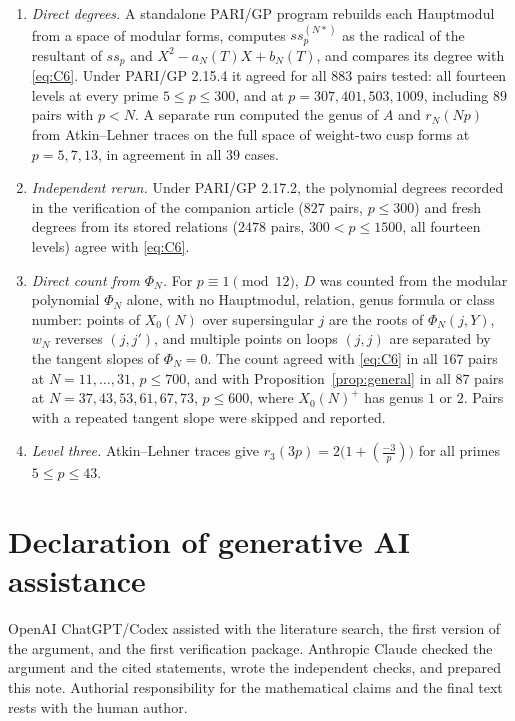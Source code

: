\documentclass[11pt,a4paper]{article}
\theoremstyle{remark}\newtheorem{remark}[theorem]{Remark}
\numberwithin{equation}{section}
\newcommand{\leg}[2]{\left(\frac{#1}{#2}\right)}
\begin{document}
\begin{enumerate}
\item \emph{Direct degrees.} A standalone PARI/GP program rebuilds each Hauptmodul from a space of modular forms, computes $ss_p^{(N*)}$ as the radical of the resultant of $ss_p$ and $X^2-a_N(T)X+b_N(T)$, and compares its degree with \eqref{eq:C6}. Under PARI/GP 2.15.4 it agreed for all $883$ pairs tested: all fourteen levels at every prime $5\leq p\leq300$, and at $p=307,401,503,1009$, including $89$ pairs with $p<N$. A separate run computed the genus of $A$ and $r_N(Np)$ from Atkin--Lehner traces on the full space of weight-two cusp forms at $p=5,7,13$, in agreement in all $39$ cases.
\item \emph{Independent rerun.} Under PARI/GP 2.17.2, the polynomial degrees recorded in the verification of the companion article ($827$ pairs, $p\leq300$) and fresh degrees from its stored relations ($2478$ pairs, $300<p\leq1500$, all fourteen levels) agree with \eqref{eq:C6}.
\item \emph{Direct count from $\Phi_N$.} For $p\equiv1\pmod{12}$, $D$ was counted from the modular polynomial $\Phi_N$ alone, with no Hauptmodul, relation, genus formula or class number: points of $X_0(N)$ over supersingular $j$ are the roots of $\Phi_N(j,Y)$, $w_N$ reverses $(j,j')$, and multiple points on loops $(j,j)$ are separated by the tangent slopes of $\Phi_N=0$. The count agreed with \eqref{eq:C6} in all $167$ pairs at $N=11,\dots,31$, $p\leq700$, and with Proposition~\ref{prop:general} in all $87$ pairs at $N=37,43,53,61,67,73$, $p\leq600$, where $X_0(N)^+$ has genus $1$ or $2$. Pairs with a repeated tangent slope were skipped and reported.
\item \emph{Level three.} Atkin--Lehner traces give $r_3(3p)=2\bigl(1+\leg{-3}{p}\bigr)$ for all primes $5\leq p\leq43$.
\end{enumerate}

\section*{Declaration of generative AI assistance}
OpenAI ChatGPT/Codex assisted with the literature search, the first version of the argument, and the first verification package. Anthropic Claude checked the argument and the cited statements, wrote the independent checks, and prepared this note. Authorial responsibility for the mathematical claims and the final text rests with the human author.
\end{document}
